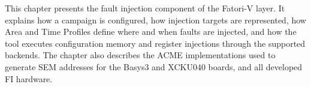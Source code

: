 This chapter presents the fault injection component of the \ac{Fatori-V} layer. It explains how a campaign is configured, how injection targets are represented, how Area and Time Profiles define where and when faults are injected, and how the tool executes configuration memory and register injections through the supported backends. The chapter also describes the \ac{ACME} implementations used to generate \ac{SEM} addresses for the Basys3 and XCKU040 boards, and all developed \ac{FI} hardware.